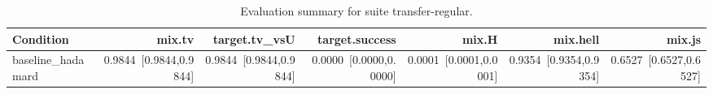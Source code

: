 \begin{table}[t]
\centering
\caption{Evaluation summary for suite transfer-regular.}
\label{tab:eval_transfer-regular}
\begin{tabular}{lrrrrrr}
\toprule
Condition & mix.tv & target.tv\_vsU & target.success & mix.H & mix.hell & mix.js \\
\midrule
baseline\_hadamard & 0.9844~[0.9844,0.9844] & 0.9844~[0.9844,0.9844] & 0.0000~[0.0000,0.0000] & 0.0001~[0.0001,0.0001] & 0.9354~[0.9354,0.9354] & 0.6527~[0.6527,0.6527] \\
\bottomrule
\end{tabular}
\end{table}
